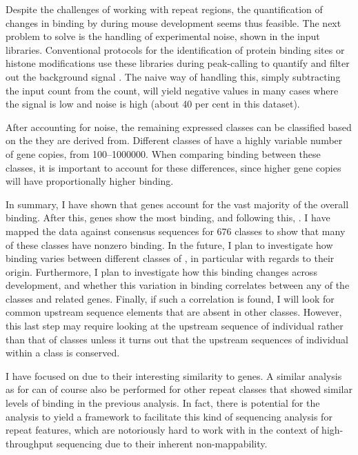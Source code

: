 Despite the challenges of working with repeat regions, the quantification of
changes in \transsine binding by  during mouse development seems thus
feasible. The next problem to solve is the handling of experimental noise, shown
in the input libraries. Conventional \chipseq protocols for the identification
of protein binding sites or histone modifications use these libraries during
peak-calling to quantify and filter out the background signal
\citep{Zhang:2008}. The naive way of handling this, simply subtracting the input
count from the  count, will yield negative values in many cases where the
signal is low and noise is high (about \num{40} per cent in this dataset).

After accounting for noise, the remaining expressed \transsine classes can be
classified based on the \rna they are derived from. Different classes of
\transsine have a highly variable number of gene copies, from
\numrange{100}{1000000}. When comparing  binding between these classes,
it is important to account for these differences, since higher gene copies will
have proportionally higher binding.

In summary, I have shown that \trna genes account for the vast majority of the
overall  binding. After this, \rrna genes show the most binding, and
following this, \transsine[s]. I have mapped the  \chip data against
consensus sequences for \num{676} \transsine classes to show that many of these
classes have nonzero  binding. In the future, I plan to investigate how
 binding varies between different classes of \transsine[s], in particular
with regards to their origin. Furthermore, I plan to investigate how this
binding changes across development, and whether this variation in binding
correlates between any of the \transsine classes and related \trna genes.
Finally, if such a correlation is found, I will look for common upstream
sequence elements that are absent in other \transsine classes. However, this
last step may require looking at the upstream sequence of individual
\transsine[s] rather than that of \transsine classes unless it turns out that
the upstream sequences of individual \transsine[s] within a class is conserved.

I have focused on \transsine[s] due to their interesting similarity to \trna
genes. A similar analysis as for \transsine[s] can of course also be performed
for other repeat classes that showed similar levels of  binding in the
previous analysis. In fact, there is potential for the \transsine analysis to
yield a framework to facilitate this kind of sequencing analysis for repeat
features, which are notoriously hard to work with in the context of
high-throughput sequencing due to their inherent non-mappability.
